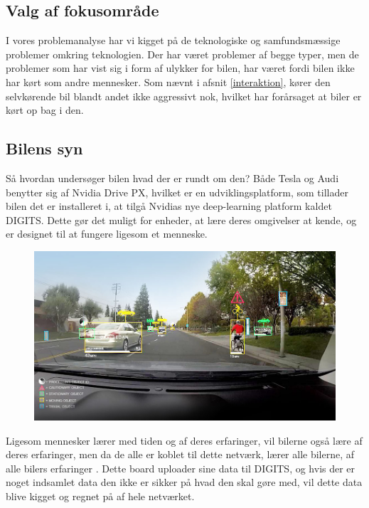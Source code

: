 \label{afgraensning}
\subsection{Valg af fokusområde}
I vores problemanalyse har vi kigget på de teknologiske og samfundsmæssige problemer omkring teknologien. Der har været problemer af begge typer, men de problemer som har vist sig i form af ulykker for bilen, har været fordi bilen ikke har kørt som andre mennesker. Som nævnt i afsnit \ref{interaktion}, kører den selvkørende bil blandt andet ikke aggressivt nok, hvilket har forårsaget at biler er kørt op bag i den.

\subsection{Bilens syn}
Så hvordan undersøger bilen hvad der er rundt om den? Både Tesla og Audi benytter sig af Nvidia Drive PX, hvilket er en udviklingsplatform, som tillader bilen det er installeret i, at tilgå Nvidias nye deep-learning platform kaldet DIGITS. Dette gør det muligt for enheder, at lære deres omgivelser at kende, og er designet til at fungere ligesom et menneske. 

\begin{figure}[h!]
	\centering
	\includegraphics[width=\textwidth]{images/nvidiadrive.png}
	\label{fig:DRIVE}
\end{figure}
Ligesom mennesker lærer med tiden og af deres erfaringer, vil bilerne også lære af deres erfaringer, men da de alle er koblet til dette netværk, lærer alle bilerne, af alle bilers erfaringer \cite{Nvidia}. Dette board uploader sine data til DIGITS, og hvis der er noget indsamlet data den ikke er sikker på hvad den skal gøre med, vil dette data blive kigget og regnet på af hele netværket.


